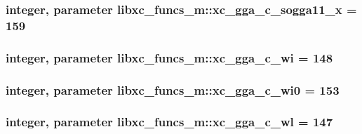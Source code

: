 \hypertarget{classlibxc__funcs__m_a687295f1b9ae8536d2409f76d20cb8e9}{
\subsubsection[{xc\-\_\-gga\-\_\-c\-\_\-sogga11\-\_\-x}]{\setlength{\rightskip}{0pt plus 5cm}integer, parameter libxc\-\_\-funcs\-\_\-m\-::xc\-\_\-gga\-\_\-c\-\_\-sogga11\-\_\-x = 159}}\label{classlibxc__funcs__m_a687295f1b9ae8536d2409f76d20cb8e9}
\hypertarget{classlibxc__funcs__m_a8ab7ca0cca8496184215d48b634ce622}{
\subsubsection[{xc\-\_\-gga\-\_\-c\-\_\-wi}]{\setlength{\rightskip}{0pt plus 5cm}integer, parameter libxc\-\_\-funcs\-\_\-m\-::xc\-\_\-gga\-\_\-c\-\_\-wi = 148}}\label{classlibxc__funcs__m_a8ab7ca0cca8496184215d48b634ce622}
\hypertarget{classlibxc__funcs__m_a632d1bb9c80ebf7dbd1a528ac99f468b}{
\subsubsection[{xc\-\_\-gga\-\_\-c\-\_\-wi0}]{\setlength{\rightskip}{0pt plus 5cm}integer, parameter libxc\-\_\-funcs\-\_\-m\-::xc\-\_\-gga\-\_\-c\-\_\-wi0 = 153}}\label{classlibxc__funcs__m_a632d1bb9c80ebf7dbd1a528ac99f468b}
\hypertarget{classlibxc__funcs__m_a2b3430b3b337d8c2cc56a47ff383c820}{
\subsubsection[{xc\-\_\-gga\-\_\-c\-\_\-wl}]{\setlength{\rightskip}{0pt plus 5cm}integer, parameter libxc\-\_\-funcs\-\_\-m\-::xc\-\_\-gga\-\_\-c\-\_\-wl = 147}}\label{classlibxc__funcs__m_a2b3430b3b337d8c2cc56a47ff383c820}
